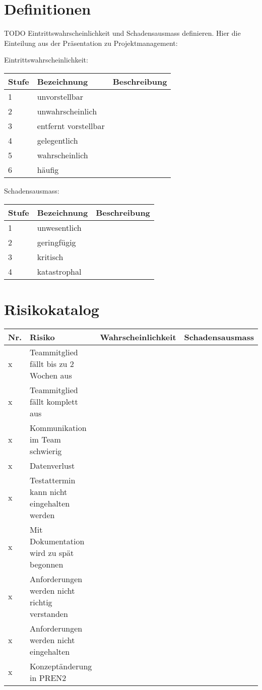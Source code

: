 \documentclass[a4paper]{report}
\begin{document}
\section{Definitionen}
TODO Eintrittswahrscheinlichkeit und Schadensausmass definieren. Hier die Einteilung aus der Präsentation zu Projektmanagement: 

Eintrittswahrscheinlichkeit: 

\begin{tabular}{|l|l|l|}
	\hline
	\textbf{Stufe} & \textbf{Bezeichnung} & \textbf{Beschreibung} \\
	\hline
	1 & unvorstellbar & \\
	\hline
	2 & unwahrscheinlich & \\
	\hline
	3 & entfernt vorstellbar & \\
	\hline
	4 & gelegentlich & \\
	\hline
	5 & wahrscheinlich & \\
	\hline
	6 & häufig & \\
	\hline
\end{tabular}

Schadensausmass:
 
\begin{tabular}{|l|l|l|}
	\hline
	\textbf{Stufe} & \textbf{Bezeichnung} & \textbf{Beschreibung} \\
	\hline
	1 & unwesentlich & \\
	\hline
	2 & geringfügig & \\
	\hline
	3 & kritisch & \\
	\hline
	4 & katastrophal & \\
	\hline
\end{tabular}
	
	
\section{Risikokatalog}
\begin{tabular}{|l|l|l|l|}
	\hline 
	\textbf{Nr.} & \textbf{Risiko} & \textbf{Wahrscheinlichkeit} & \textbf{Schadensausmass} \\
	\hline
	x & Teammitglied fällt bis zu 2 Wochen aus & & \\
	\hline 
	x & Teammitglied fällt komplett aus & & \\
	\hline
	x & Kommunikation im Team schwierig & & \\
	\hline
	x & Datenverlust & & \\
	\hline 
	x & Testattermin kann nicht eingehalten werden & & \\
	\hline
	x & Mit Dokumentation wird zu spät begonnen & & \\
	\hline
	x & Anforderungen werden nicht richtig verstanden & & \\
	\hline
	x & Anforderungen werden nicht eingehalten & & \\
	\hline
	x & Konzeptänderung in PREN2 & & \\
	\hline
\end{tabular}
\end{document}
